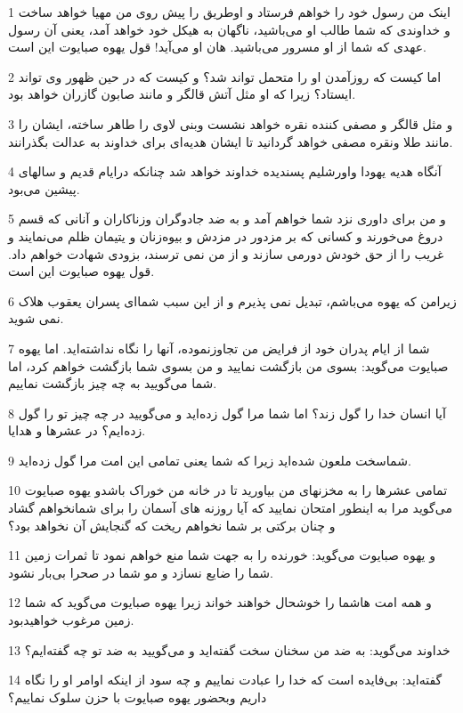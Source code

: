 \par 1 اینک من رسول خود را خواهم فرستاد و اوطریق را پیش روی من مهیا خواهد ساخت و خداوندی که شما طالب او می‌باشید، ناگهان به هیکل خود خواهد آمد، یعنی آن رسول عهدی که شما از او مسرور می‌باشید. هان او می‌آید! قول یهوه صبایوت این است.
\par 2 اما کیست که روزآمدن او را متحمل تواند شد؟ و کیست که در حین ظهور وی تواند ایستاد؟ زیرا که او مثل آتش قالگر و مانند صابون گازران خواهد بود.
\par 3 و مثل قالگر و مصفی کننده نقره خواهد نشست وبنی لاوی را طاهر ساخته، ایشان را مانند طلا ونقره مصفی خواهد گردانید تا ایشان هدیه‌ای برای خداوند به عدالت بگذرانند.
\par 4 آنگاه هدیه یهودا واورشلیم پسندیده خداوند خواهد شد چنانکه درایام قدیم و سالهای پیشین می‌بود.
\par 5 و من برای داوری نزد شما خواهم آمد و به ضد جادوگران وزناکاران و آنانی که قسم دروغ می‌خورند و کسانی که بر مزدور در مزدش و بیوه‌زنان و یتیمان ظلم می‌نمایند و غریب را از حق خودش دورمی سازند و از من نمی ترسند، بزودی شهادت خواهم داد. قول یهوه صبایوت این است.
\par 6 زیرامن که یهوه می‌باشم، تبدیل نمی پذیرم و از این سبب شما‌ای پسران یعقوب هلاک نمی شوید.
\par 7 شما از ایام پدران خود از فرایض من تجاوزنموده، آنها را نگاه نداشته‌اید. اما یهوه صبایوت می‌گوید: بسوی من بازگشت نمایید و من بسوی شما بازگشت خواهم کرد، اما شما می‌گویید به چه چیز بازگشت نماییم.
\par 8 آیا انسان خدا را گول زند؟ اما شما مرا گول زده‌اید و می‌گویید در چه چیز تو را گول زده‌ایم؟ در عشرها و هدایا.
\par 9 شماسخت ملعون شده‌اید زیرا که شما یعنی تمامی این امت مرا گول زده‌اید.
\par 10 تمامی عشرها را به مخزنهای من بیاورید تا در خانه من خوراک باشدو یهوه صبایوت می‌گوید مرا به اینطور امتحان نمایید که آیا روزنه های آسمان را برای شمانخواهم گشاد و چنان برکتی بر شما نخواهم ریخت که گنجایش آن نخواهد بود؟
\par 11 و یهوه صبایوت می‌گوید: خورنده را به جهت شما منع خواهم نمود تا ثمرات زمین شما را ضایع نسازد و مو شما در صحرا بی‌بار نشود.
\par 12 و همه امت هاشما را خوشحال خواهند خواند زیرا یهوه صبایوت می‌گوید که شما زمین مرغوب خواهیدبود.
\par 13 خداوند می‌گوید: به ضد من سخنان سخت گفته‌اید و می‌گویید به ضد تو چه گفته‌ایم؟
\par 14 گفته‌اید: بی‌فایده است که خدا را عبادت نماییم و چه سود از اینکه اوامر او را نگاه داریم وبحضور یهوه صبایوت با حزن سلوک نماییم؟
